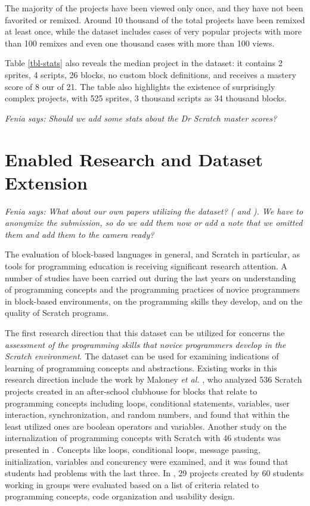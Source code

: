 \documentclass[10pt, conference]{IEEEtran}
\newcommand{\fenia}[1]{\emph{\color{blue}Fenia says: #1}}
\begin{document}
The majority of the projects have been viewed only once, and they have not been favorited or remixed.
Around 10 thousand of the total projects have been remixed at least once, while the dataset includes cases of very popular projects with more than 100 remixes and even one thousand cases with more than 100 views. 

Table \ref{tbl-stats} also reveals the median project in the dataset: it contains 2 sprites, 4 scripts, 26 blocks, no custom block definitions, and receives a mastery score of 8 our of 21.
The table also highlights the existence of surprisingly complex projects, with 525 sprites, 3 thousand scripts as 34 thousand blocks.

\fenia{Should we add some stats about the Dr Scratch master scores?}

\section{Enabled Research and Dataset Extension}
\fenia{What about our own papers utilizing the dataset? (\cite{Aivaloglou_2016} and \cite{Robles_2017}). We have to anonymize the submission, so do we add them now or add a note that we omitted them and add them to the camera ready?}

The evaluation of block-based languages in general, and Scratch in particular, as tools for programming education is receiving significant research attention.
A number of studies have been carried out during the last years on understanding of programming concepts and the programming practices of novice programmers in block-based environments, on the programming skills they develop, and on the quality of Scratch programs.

The first research direction that this dataset can be utilized for concerns the \textit{assessment of the programming skills that novice programmers develop in the Scratch environment}.
The dataset can be used for examining indications of learning of programming concepts and abstractions.
Existing works in this research direction include the work by Maloney \emph{et al.} \cite{Maloney_2008}, who analyzed 536 Scratch projects created in an after-school clubhouse for blocks that relate to programming concepts including loops, conditional statements, variables, user interaction, synchronization, and random numbers, and found that within the least utilized ones are boolean operators and variables.
Another study on the internalization of programming concepts with Scratch with 46 students was presented in \cite{meerbaum-salant_learning_2010}.
Concepts like loops, conditional loops, message passing, initialization, variables and concurency were examined, and it was found that students had problems with the last three. In \cite{wilson_evaluation_2012}, 29 projects created by 60 students working in groups were evaluated based on a list of criteria related to programming concepts, code organization and usability design.
\end{document}
